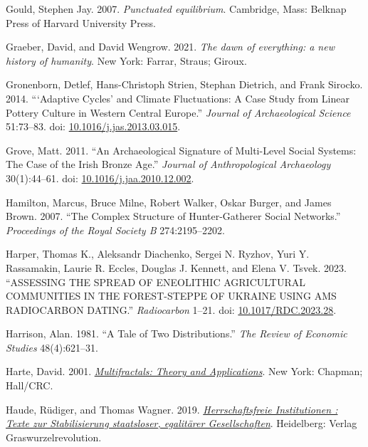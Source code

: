 \documentclass[
  12pt,
]{book}
\newlength{\cslhangindent}
\newlength{\cslentryspacingunit} %
\newenvironment{CSLReferences}[2] %
 {%
  \setlength{\parindent}{0pt}
  \ifodd #1
  \let\oldpar\par
  \def\par{\hangindent=\cslhangindent\oldpar}
  \fi
  \setlength{\parskip}{#2\cslentryspacingunit}
 }%
 {}
\begin{document}
\begin{CSLReferences}{1}{0}
\leavevmode{}%
Gould, Stephen Jay. 2007. \emph{Punctuated equilibrium}. Cambridge, Mass: Belknap Press of Harvard University Press.

\leavevmode{}%
Graeber, David, and David Wengrow. 2021. \emph{The dawn of everything: a new history of humanity}. New York: Farrar, Straus; Giroux.

\leavevmode{}%
Gronenborn, Detlef, Hans-Christoph Strien, Stephan Dietrich, and Frank Sirocko. 2014. {``{`}Adaptive Cycles{'} and Climate Fluctuations: A Case Study from Linear Pottery Culture in Western Central Europe.''} \emph{Journal of Archaeological Science} 51:73--83. doi: \href{https://doi.org/10.1016/j.jas.2013.03.015}{10.1016/j.jas.2013.03.015}.

\leavevmode{}%
Grove, Matt. 2011. {``An Archaeological Signature of Multi-Level Social Systems: The Case of the Irish Bronze Age.''} \emph{Journal of Anthropological Archaeology} 30(1):44--61. doi: \href{https://doi.org/10.1016/j.jaa.2010.12.002}{10.1016/j.jaa.2010.12.002}.

\leavevmode{}%
Hamilton, Marcus, Bruce Milne, Robert Walker, Oskar Burger, and James Brown. 2007. {``The Complex Structure of Hunter-Gatherer Social Networks.''} \emph{Proceedings of the Royal Society B} 274:2195--2202.

\leavevmode{}%
Harper, Thomas K., Aleksandr Diachenko, Sergei N. Ryzhov, Yuri Y. Rassamakin, Laurie R. Eccles, Douglas J. Kennett, and Elena V. Tsvek. 2023. {``ASSESSING THE SPREAD OF ENEOLITHIC AGRICULTURAL COMMUNITIES IN THE FOREST-STEPPE OF UKRAINE USING AMS RADIOCARBON DATING.''} \emph{Radiocarbon} 1--21. doi: \href{https://doi.org/10.1017/RDC.2023.28}{10.1017/RDC.2023.28}.

\leavevmode{}%
Harrison, Alan. 1981. {``A Tale of Two Distributions.''} \emph{The Review of Economic Studies} 48(4):621--31.

\leavevmode{}%
Harte, David. 2001. \emph{\href{https://doi.org/10.1201/9781420036008}{Multifractals: Theory and Applications}}. New York: Chapman; Hall/CRC.

\leavevmode{}%
Haude, Rüdiger, and Thomas Wagner. 2019. \emph{\href{http://www.deutsche-digitale-bibliothek.de/item/7WYRGHTXGAOZOF5JUQ5JQCONFJKLTBIE}{Herrschaftsfreie Institutionen : Texte zur Stabilisierung staatsloser, egalitärer Gesellschaften}}. Heidelberg: Verlag Graswurzelrevolution.


\end{CSLReferences}
\end{document}
